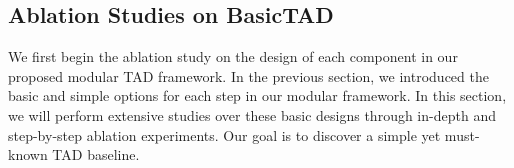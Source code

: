 \documentclass[a4paper,fleqn]{cas-dc}
\begin{document}
\subsection{Ablation Studies on BasicTAD} 

We first begin the ablation study on the design of each component in our proposed modular TAD framework. In the previous section, we introduced the basic and simple options for each step in our modular framework. In this section, we will perform extensive studies over these basic designs through in-depth and step-by-step ablation experiments. Our goal is to discover a simple yet must-known TAD baseline.


\begin{table*}[t]
\centering
\small
\caption{\textbf{Performance of BasicTAD on different backbones on THUMOS14~\citep{THUMOS14}}. We replace SlowOnly with C3D~\citep{c3d}, I3D~\citep{i3d} and R50-I3D~\citep{r50-i3d-non-local} for our BasicTAD to perform experiments, where I3D only retains RGB branch. }
\label{table:backbone}
\setlength\tabcolsep{4.7mm}
\end{table*}
\end{document}
